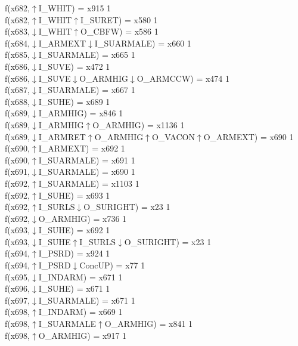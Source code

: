 f(x682,$\uparrow$I\_WHIT) = x915 {1} \\
f(x682,$\uparrow$I\_WHIT$\uparrow$I\_SURET) = x580 {1} \\
f(x683,$\downarrow$I\_WHIT$\uparrow$O\_CBFW) = x586 {1} \\
f(x684,$\downarrow$I\_ARMEXT$\downarrow$I\_SUARMALE) = x660 {1} \\
f(x685,$\downarrow$I\_SUARMALE) = x665 {1} \\
f(x686,$\downarrow$I\_SUVE) = x472 {1} \\
f(x686,$\downarrow$I\_SUVE$\downarrow$O\_ARMHIG$\downarrow$O\_ARMCCW) = x474 {1} \\
f(x687,$\downarrow$I\_SUARMALE) = x667 {1} \\
f(x688,$\downarrow$I\_SUHE) = x689 {1} \\
f(x689,$\downarrow$I\_ARMHIG) = x846 {1} \\
f(x689,$\downarrow$I\_ARMHIG$\uparrow$O\_ARMHIG) = x1136 {1} \\
f(x689,$\downarrow$I\_ARMRET$\uparrow$O\_ARMHIG$\uparrow$O\_VACON$\uparrow$O\_ARMEXT) = x690 {1} \\
f(x690,$\uparrow$I\_ARMEXT) = x692 {1} \\
f(x690,$\uparrow$I\_SUARMALE) = x691 {1} \\
f(x691,$\downarrow$I\_SUARMALE) = x690 {1} \\
f(x692,$\uparrow$I\_SUARMALE) = x1103 {1} \\
f(x692,$\uparrow$I\_SUHE) = x693 {1} \\
f(x692,$\uparrow$I\_SURLS$\downarrow$O\_SURIGHT) = x23 {1} \\
f(x692,$\downarrow$O\_ARMHIG) = x736 {1} \\
f(x693,$\downarrow$I\_SUHE) = x692 {1} \\
f(x693,$\downarrow$I\_SUHE$\uparrow$I\_SURLS$\downarrow$O\_SURIGHT) = x23 {1} \\
f(x694,$\uparrow$I\_PSRD) = x924 {1} \\
f(x694,$\uparrow$I\_PSRD$\downarrow$ConcUP) = x77 {1} \\
f(x695,$\downarrow$I\_INDARM) = x671 {1} \\
f(x696,$\downarrow$I\_SUHE) = x671 {1} \\
f(x697,$\downarrow$I\_SUARMALE) = x671 {1} \\
f(x698,$\uparrow$I\_INDARM) = x669 {1} \\
f(x698,$\uparrow$I\_SUARMALE$\uparrow$O\_ARMHIG) = x841 {1} \\
f(x698,$\uparrow$O\_ARMHIG) = x917 {1} \\
